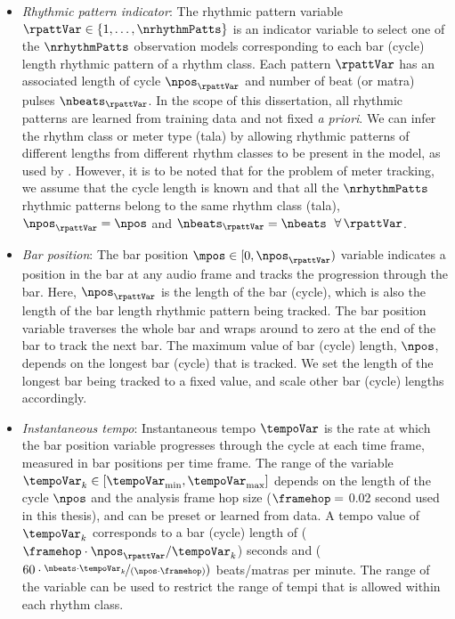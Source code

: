 \begin{itemize}[leftmargin=*]
\item \textit{Rhythmic pattern indicator}: The rhythmic pattern variable $\rpattVar \in \lbrace 1, \ldots, \nrhythmPatts\rbrace$ is an indicator variable to select one of the $\nrhythmPatts$ observation models corresponding to each bar (cycle) length rhythmic pattern of a rhythm class. Each pattern $\rpattVar$ has an associated length of cycle $\npos_\rpattVar$ and number of beat (or \gls{matra}) pulses $\nbeats_\rpattVar$. In the scope of this dissertation, all rhythmic patterns are learned from training data and not fixed \textit{a priori}. We can infer the rhythm class or meter type (\gls{tala}) by allowing rhythmic patterns of different lengths from different rhythm classes to be present in the model, as used by . However, it is to be noted that for the problem of meter tracking, we assume that the cycle length is known and that all the $\nrhythmPatts$ rhythmic patterns belong to the same rhythm class (\gls{tala}), $\npos_\rpattVar = \npos$ and $\nbeats_\rpattVar = \nbeats$~$\forall \, \rpattVar$. 

\item \textit{Bar position}: The bar position $\mpos \in [0, \npos_\rpattVar)$ variable indicates a position in the bar at any audio frame and tracks the progression through the bar. Here, $\npos_\rpattVar$ is the length of the bar (cycle), which is also the length of the bar length rhythmic pattern being tracked. The bar position variable traverses the whole bar and wraps around to zero at the end of the bar to track the next bar. The maximum value of bar (cycle) length, $\npos$, depends on the longest bar (cycle) that is tracked. We set the length of the longest bar being tracked to a fixed value, and scale other bar (cycle) lengths accordingly. 
\item \textit{Instantaneous tempo}: Instantaneous tempo $\tempoVar$ is the rate at which the bar position variable progresses through the cycle at each time frame, measured in bar positions per time frame. The range of the variable $\tempoVar_k \in [\tempoVar_{\min}, \tempoVar_{\max}]$ depends on the length of the cycle $\npos$ and the analysis frame hop size ($\framehop = $ 0.02 second used in this thesis), and can be preset or learned from data. A tempo value of $\tempoVar_{k}$ corresponds to a bar (cycle) length of ($\framehop \cdot \npos_\rpattVar / \tempoVar_{k}$) seconds and ($60 \cdot \nicefrac{\nbeats\cdot\tempoVar_k}{(\npos \cdot\framehop)})$ beats/\glspl{matra} per minute. The range of the variable can be used to restrict the range of tempi that is allowed within each rhythm class. 
\end{itemize}
